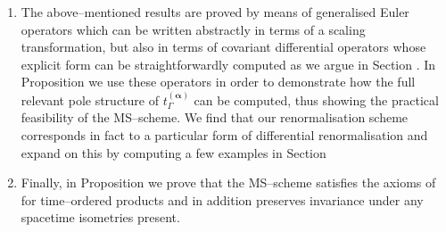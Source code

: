 \documentclass[10pt]{book}
\theoremstyle{break}
\begin{document}
\begin{enumerate}
\item The above--mentioned results are proved by means of generalised Euler operators which can be written abstractly in terms of a scaling transformation, but also in terms of covariant differential operators whose explicit form can be straightforwardly computed as we argue in Section %
.  In Proposition %
we use these operators in order to demonstrate how the full relevant pole structure of $t_\Gamma^{(\boldsymbol{\alpha})}$ can be computed, thus showing the practical feasibility of the MS--scheme. We find that our renormalisation scheme corresponds in fact to a particular form of differential renormalisation and expand on this by computing a few examples in Section %

\item Finally, in Proposition %
we prove that the MS--scheme satisfies the axioms of %
for time--ordered products and in addition preserves invariance under any spacetime isometries present.
\end{enumerate}
\end{document}
